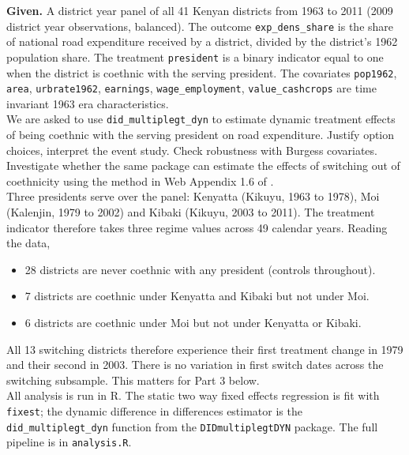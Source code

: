 

\noindent \textbf{Given.} A district year panel of all 41 Kenyan districts from 1963 to 2011 (2009 district year observations, balanced). The outcome \texttt{exp\_dens\_share} is the share of national road expenditure received by a district, divided by the district's 1962 population share. The treatment \texttt{president} is a binary indicator equal to one when the district is coethnic with the serving president. The covariates \texttt{pop1962}, \texttt{area}, \texttt{urbrate1962}, \texttt{earnings}, \texttt{wage\_employment}, \texttt{value\_cashcrops} are time invariant 1963 era characteristics.\\

\noindent We are asked to use \texttt{did\_multiplegt\_dyn} to estimate dynamic treatment effects of being coethnic with the serving president on road expenditure. Justify option choices, interpret the event study. Check robustness with Burgess covariates. Investigate whether the same package can estimate the effects of switching out of coethnicity using the method in Web Appendix 1.6 of \citet{dCDH2024}.\\

 \noindent Three presidents serve over the panel: Kenyatta (Kikuyu, 1963 to 1978), Moi (Kalenjin, 1979 to 2002) and Kibaki (Kikuyu, 2003 to 2011). The treatment indicator therefore takes three regime values across 49 calendar years. Reading the data,
\begin{itemize}\setlength\itemsep{0pt}
  \item 28 districts are never coethnic with any president (controls throughout).
  \item 7 districts are coethnic under Kenyatta and Kibaki but not under Moi.
  \item 6 districts are coethnic under Moi but not under Kenyatta or Kibaki.
\end{itemize}
All 13 switching districts therefore experience their first treatment change in 1979 and their second in 2003. There is no variation in first switch dates across the switching subsample. This matters for Part 3 below.\\

\noindent All analysis is run in R. The static two way fixed effects regression is fit with \texttt{fixest}; the dynamic difference in differences estimator is the \texttt{did\_multiplegt\_dyn} function from the \texttt{DIDmultiplegtDYN} package. The full pipeline is in \texttt{analysis.R}.

